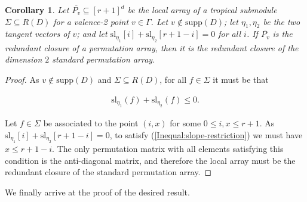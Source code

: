 \documentclass{amsart}
\newtheorem{corollary}[theorem]{Corollary}
\begin{document}
	\begin{corollary}
		\label{Cor:most-arrays-standard-dim2}
		Let $\overline{P_v} \subseteq [r+1]^d$ be the local array of a tropical submodule $\Sigma \subseteq R(D)$ for a valence-2 point $v \in \Gamma$. Let $v \not \in \mathrm{supp}(D)$; let $\eta_1, \eta_2$ be the two tangent vectors of $v$; and let $\mathrm{sl}_{\eta_1}[i] + \mathrm{sl}_{\eta_2}[r+1-i] = 0$ for all $i$. If $\overline{P_v}$ is the redundant closure of a permutation array, then it is the redundant closure of the dimension $2$ standard permutation array.
	\end{corollary}
	
	\begin{proof}
		As $v \not \in \mathrm{supp}(D)$ and $\Sigma \subseteq R(D)$, for all $f \in \Sigma$ it must be that 
		
		\begin{align}
			\mathrm{sl}_{\eta_1}(f) + \mathrm{sl}_{\eta_2}(f) \leq 0. \label{Inequal:slope-restriction}
		\end{align}
		
		Let $f \in \Sigma$ be associated to the point $(i,x)$ for some $0 \leq i, x \leq r+1$. As $\mathrm{sl}_{\eta_1}[i] + \mathrm{sl}_{\eta_2}[r+1-i] = 0$, to satisfy (\ref{Inequal:slope-restriction}) we must have $x \leq r+1-i$. The only permutation matrix with all elements satisfying this condition is the anti-diagonal matrix, and therefore the local array must be the redundant closure of the standard permutation array.
	\end{proof}
	
	We finally arrive at the proof of the desired result.
	
\end{document}
